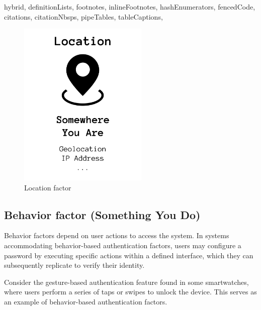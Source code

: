 \documentclass[
  digital,     %
  oneside,     %
  nosansbold,  %
  nocolorbold, %
  lof,         %
  lot,         %
]{fithesis4}
\begin{document}
\begin{markdown*}{%
  hybrid,
  definitionLists,
  footnotes,
  inlineFootnotes,
  hashEnumerators,
  fencedCode,
  citations,
  citationNbsps,
  pipeTables,
  tableCaptions,
}
\begin{figure}[htbp]
  \centering
  \includegraphics[width=0.55\textwidth]{img/location-final.png}
  \caption{Location factor}
  \label{fig:location-factor}
\end{figure}

\newpage
\subsection{Behavior factor (Something You Do)}
Behavior factors depend on user actions to access the system. In systems accommodating behavior-based authentication factors, users may configure a password by executing specific actions within a defined interface, which they can subsequently replicate to verify their identity.

Consider the gesture-based authentication feature found in some smartwatches, where users perform a series of taps or swipes to unlock the device. This serves as an example of behavior-based authentication factors.


\end{markdown*}
\end{document}
